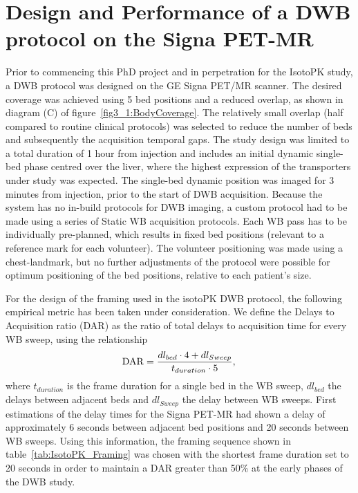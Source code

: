 \section{Design and Performance of a DWB protocol on the Signa PET-MR}
Prior to commencing this PhD project and in perpetration for the IsotoPK study, a DWB protocol was designed on the GE Signa PET/MR scanner. The desired coverage was achieved using 5 bed positions and a reduced overlap, as shown in diagram (C) of figure~\ref{fig3_1:BodyCoverage}. The relatively small overlap (half compared to routine clinical protocols) was selected to reduce the number of beds and subsequently the acquisition temporal gaps.
The study design was limited to a total duration of 1 hour from injection and includes an initial dynamic single-bed phase centred over the liver, where the highest expression of the transporters under study was expected. 
The single-bed dynamic position was imaged for 3 minutes from injection, prior to the start of DWB acquisition.
Because the system has no in-build protocols for DWB imaging, a custom protocol had to be made using a series of Static WB acquisition protocols. Each WB pass has to be individually pre-planned, which results in fixed bed positions (relevant to a reference mark for each volunteer). The volunteer positioning was made using a chest-landmark, but no further adjustments of the protocol were possible for optimum positioning of the bed positions, relative to each patient's size.

For the design of the framing used in the isotoPK DWB protocol, the following empirical metric has been taken under consideration. We define the Delays to Acquisition ratio (DAR) as the ratio of total delays to acquisition time for every WB sweep, using the relationship
\begin{equation} \label{eqn:acq_to_dead_time}
 \mathrm{DAR} = \frac{dl_{bed}\cdot 4 + dl_{Sweep}}{t_{duration}\cdot 5 }  \\ , \\ 
\end{equation}
where $t_{duration}$ is the frame duration for a single bed in the WB sweep, $dl_{bed}$ the delays between adjacent beds and $dl_{Sweep}$ the delay between WB sweeps.
First estimations of the delay times for the Signa PET-MR had shown a delay of approximately 6 seconds between adjacent bed positions and 20 seconds between WB sweeps. Using this information, the framing sequence shown in table~\ref{tab:IsotoPK_Framing} was chosen with the shortest frame duration set to 20 seconds in order to maintain a DAR greater than 50\% at the early phases of the DWB study. 

